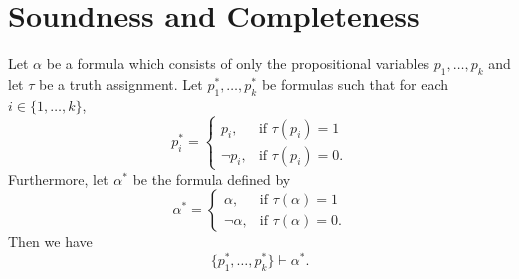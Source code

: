 \section{Soundness and Completeness}
\begin{theorem}
  Let $\alpha$ be a formula which consists of only the propositional variables
  $p_1, \dots, p_k$ and let $\tau$ be a truth assignment.
  Let $p_1^*, \dots, p_k^*$ be formulas such that for each
  $i \in \{1, \dots, k\}$,
  \begin{equation*}
    p_i^* =
    \begin{cases}
      p_i, & \text{if $\tau(p_i) = 1$} \\
      \neg p_i, & \text{if $\tau(p_i) = 0$}.
    \end{cases}
  \end{equation*}
  Furthermore, let $\alpha^*$ be the formula defined by
  \begin{equation*}
    \alpha^* =
    \begin{cases}
      \alpha, & \text{if $\tau(\alpha) = 1$} \\
      \neg \alpha, & \text{if $\tau(\alpha) = 0$}.
    \end{cases}
  \end{equation*}
  Then we have
  \begin{equation*}
    \{p_1^*, \dots, p_k^*\} \vdash \alpha^*.
  \end{equation*}
\end{theorem}
